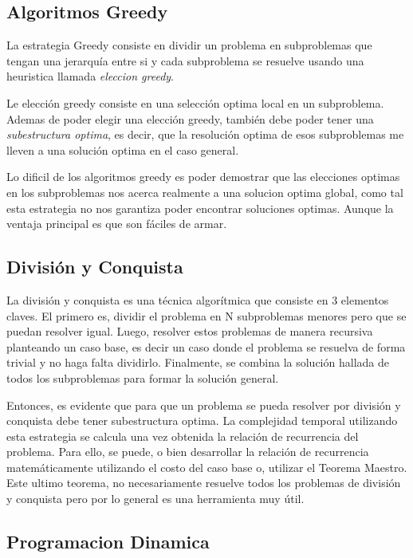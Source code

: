\documentclass[titlepage,a4paper]{article}
\begin{document}
\subsection{Algoritmos Greedy}
\label{sec:org7d5a3e3}

La estrategia Greedy consiste en dividir un problema en subproblemas que tengan
una jerarquía entre si y cada subproblema se resuelve usando una heuristica
llamada \emph{eleccion greedy}.

Le elección greedy consiste en una selección optima local en un subproblema.
Ademas de poder elegir una elección greedy, también debe poder tener una
\emph{subestructura optima}, es decir, que la resolución optima de esos subproblemas me
lleven a una solución optima en el caso general.

Lo dificil de los algoritmos greedy es poder demostrar que las elecciones optimas
en los subproblemas nos acerca realmente a una solucion optima global, como tal
esta estrategia no nos garantiza poder encontrar soluciones optimas. Aunque la
ventaja principal es que son fáciles de armar.

\subsection{División y Conquista}
\label{sec:org19adeda}

La división y conquista es una técnica algorítmica que consiste en 3 elementos
claves. El primero es, dividir el problema en N subproblemas menores pero que se
puedan resolver igual. Luego, resolver estos problemas de manera recursiva
planteando un caso base, es decir un caso donde el problema se resuelva de forma
trivial y no haga falta dividirlo. Finalmente, se combina la solución hallada de
todos los subproblemas para formar la solución general.

Entonces, es evidente que para que un problema se pueda resolver por división y
conquista debe tener subestructura optima. La complejidad temporal utilizando
esta estrategia se calcula una vez obtenida la relación de recurrencia del
problema. Para ello, se puede, o bien desarrollar la relación de recurrencia
matemáticamente utilizando el costo del caso base o, utilizar el Teorema
Maestro. Este ultimo teorema, no necesariamente resuelve todos los problemas de
división y conquista pero por lo general es una herramienta muy útil.

\subsection{Programacion Dinamica}
\label{sec:orgacd0bd4}
\end{document}
